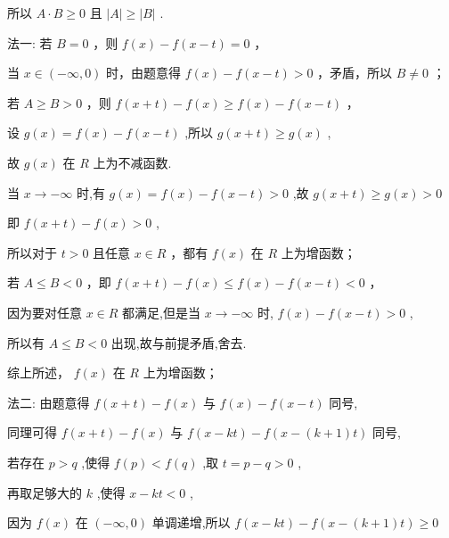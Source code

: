 \documentclass[10pt]{article}
\newcommand*\circled[1]{\tikz[baseline=(char.base)]{\node[shape=circle,draw,inner sep=1.5pt] (char) {\small #1};}}
\begin{document}
所以 \(A \cdot  B \geq  0\) 且 \(\left| A\right|  \geq  \left| B\right|\) .

法一: \circled{1}  若 \(B = 0\) ，则 \(f\left( x\right)  - f\left( {x - t}\right)  = 0\) ，

当 \(x \in  \left( {-\infty ,0}\right)\) 时，由题意得 \(f\left( x\right)  - f\left( {x - t}\right)  > 0\) ，矛盾，所以 \(B \neq  0\) ；

 \circled{2} 若 \(A \geq  B > 0\) ，则 \(f\left( {x + t}\right)  - f\left( x\right)  \geq  f\left( x\right)  - f\left( {x - t}\right)\) ，

设 \(g\left( x\right)  = f\left( x\right)  - f\left( {x - t}\right)\) ,所以 \(g\left( {x + t}\right)  \geq  g\left( x\right)\) ,

故 \(g\left( x\right)\) 在 \(R\) 上为不减函数.

当 \(x \rightarrow   - \infty\) 时,有 \(g\left( x\right)  = f\left( x\right)  - f\left( {x - t}\right)  > 0\) ,故 \(g\left( {x + t}\right)  \geq  g\left( x\right)  > 0\)

即 \(f\left( {x + t}\right)  - f\left( x\right)  > 0\) ,

所以对于 \(t > 0\) 且任意 \(x \in  R\) ，都有 \(f\left( x\right)\) 在 \(R\) 上为增函数；

 \circled{3}  若 \(A \leq  B < 0\) ，即 \(f\left( {x + t}\right)  - f\left( x\right)  \leq  f\left( x\right)  - f\left( {x - t}\right)  < 0\) ，

因为要对任意 \(x \in  R\) 都满足,但是当 \(x \rightarrow   - \infty\) 时, \(f\left( x\right)  - f\left( {x - t}\right)  > 0\) ,

所以有 \(A \leq  B < 0\) 出现,故与前提矛盾,舍去.

综上所述， \(f\left( x\right)\) 在 \(R\) 上为增函数；

法二: 由题意得 \(f\left( {x + t}\right)  - f\left( x\right)\) 与 \(f\left( x\right)  - f\left( {x - t}\right)\) 同号,

同理可得 \(f\left( {x + t}\right)  - f\left( x\right)\) 与 \(f\left( {x - {kt}}\right)  - f\left( {x - \left( {k + 1}\right) t}\right)\) 同号,

若存在 \(p > q\) ,使得 \(f\left( p\right)  < f\left( q\right)\) ,取 \(t = p - q > 0\) ,

再取足够大的 \(k\) ,使得 \(x - {kt} < 0\) ,

因为 \(f\left( x\right)\) 在 \(\left( {-\infty ,0}\right)\) 单调递增,所以 \(f\left( {x - {kt}}\right)  - f\left( {x - \left( {k + 1}\right) t}\right)  \geq  0\)
\end{document}

